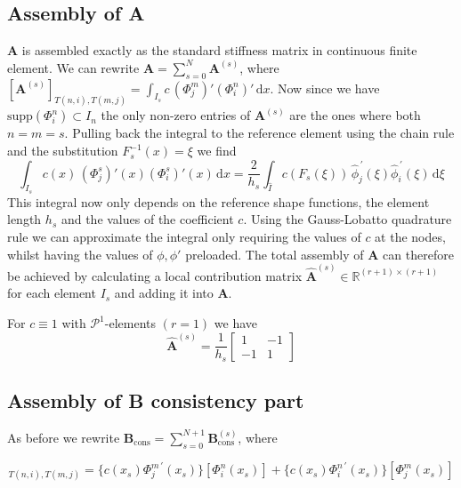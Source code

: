 \subsection{Assembly of A}
$\textbf{A}$ is assembled exactly as the standard stiffness matrix in continuous finite element.
We can rewrite $\textbf{A} = \sum_{s=0}^{N} \textbf{A}^{(s)}$, where 
$[\textbf{A}^{(s)}]_{T(n,i),T(m,j)} = \int_{I_s} c \,(\Phi_j^m)' (\Phi_i^n)' \, \text{d}x$.
Now since we have $\text{supp}(\Phi_i^n)\subset I_n$ the only non-zero entries of $\textbf{A}^{(s)} $ are the ones where both $n=m=s$. Pulling back the integral 
to the reference element using the chain rule and the substitution $F_s^{-1}(x) = \xi$ we find
\begin{equation*}
    \int_{I_s} c(x) \,(\Phi_j^s)'(x) (\Phi_i^s)'(x) \, \text{d}x = 
    \frac{2}{h_s} \int_{\hat{I}} c(F_s(\xi)) \, \widehat{\phi}_j^{\, \prime}(\xi) \widehat{\phi}_i^{\, \prime}(\xi) \, \text{d}\xi
\end{equation*}
This integral now only depends on the reference shape functions, the element length $h_s$
and the values of the coefficient $c$. Using the Gauss-Lobatto quadrature rule we can approximate the integral
only requiring the values of $c$ at the nodes, whilst having the values of $\phi, \phi'$ preloaded.
The total assembly of $\textbf{A}$ can therefore be achieved by calculating a local contribution matrix 
$\widehat{\textbf{A}}^{(s)} \in \mathbb{R}^{(r+1)\times (r+1)}$ for each element $I_s$ and adding it into $\textbf{A}$. 
\begin{example}
    For $c\equiv 1$ with $\mathcal{P}^1$-elements $(r=1)$ we have 
\begin{equation*}
    \widehat{\textbf{A}}^{(s)} = \frac{1}{h_s}
    \begin{bmatrix}
         1  & -1 \\
        -1  &  1 
    \end{bmatrix}
\end{equation*}
\end{example}

\subsection{Assembly of B consistency part}
\label{subsec:assembly_cons}
As before we rewrite $\textbf{B}_{\text{cons}} = \sum_{s=0}^{N+1} \textbf{B}_{\text{cons}}^{(s)} $, where 

\begin{equation*}
    [\textbf{B}_{\text{cons}}^{(s)}]_{T(n,i),T(m,j)} = \{c(x_s) \Phi_j^{m \, \prime} (x_s)\}[\Phi_i^n(x_s)] + \{c(x_s)\Phi_i^{n\, \prime} (x_s)\}[\Phi_j^m(x_s)]
\end{equation*}

